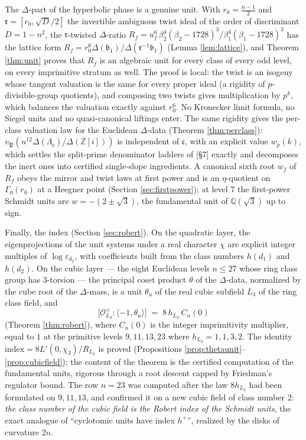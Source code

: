 \documentclass[11pt]{amsart}
\numberwithin{equation}{section}
\theoremstyle{plain}
\theoremstyle{definition}
\theoremstyle{remark}
\newcommand{\Q}{\mathbb{Q}}
\newcommand{\Z}{\mathbb{Z}}
\newcommand{\Zi}{\Z[i]}
\newcommand{\idealb}{\mathfrak{b}}
\newcommand{\idealc}{\mathfrak{c}}
\newcommand{\idealP}{\mathfrak{P}}
\newcommand{\idealr}{\mathfrak{r}}
\newcommand{\lat}[1]{\left[#1\right]}
\newcommand{\Oc}{\mathcal{O}}
\newcommand{\eps}{\varepsilon}
\newcommand{\PaperI}{\cite{SchmidtI}}
\begin{document}
The $\Delta$-part of the hyperbolic phase is a genuine unit.  With
$r_0 = \tfrac{n-1}2$ and $\idealr = \lat{r_0, \sqrt D/2}$ the invertible
ambiguous twist ideal of the order of discriminant $D = 1 - n^2$, the
$\idealr$-twisted $\Delta$-ratio
$R_f = u_f^{6}\,\beta_2^4(\beta_2-1728)^3/\beta_1^4(\beta_1-1728)^3$ has
the lattice form $R_f = r_0^{6}\Delta(\idealb_1)/\Delta(\idealr^{-1}\idealb_1)$
(Lemma \ref{lem:lattice}), and Theorem \ref{thm:unit} proves that $R_f$
is an algebraic unit for every class of every odd level, on every
imprimitive stratum as well.  The proof is local: the twist is an isogeny
whose tangent valuation is the same for every proper ideal (a rigidity of
$p$-divisible-group quotients), and composing two twists gives
multiplication by $p^k$, which balances the valuation exactly against
$r_0^6$.  No Kronecker limit formula, no Siegel units and no
quasi-canonical liftings enter.  The same rigidity gives the per-class
valuation law for the Euclidean $\Delta$-data (Theorem \ref{thm:perclass}):
$v_\idealP(n^{12}\Delta(\Lambda_\idealc)/\Delta(\Zi))$ is independent of
$\idealc$, with an explicit value $w_p(k)$, which settles the
split-prime denominator ladders of \PaperI[\S7] exactly and decomposes
the inert ones into certified single-slope ingredients.  A canonical
sixth root $w_f$ of $R_f$ obeys the mirror and twist laws at first power
and is an $\eta$-quotient on $\Gamma_0(r_0)$ at a Heegner point (Section
\ref{sec:firstpower}); at level $7$ the first-power Schmidt units are
$w = -(2 \pm \sqrt3)$, the fundamental unit of $\Q(\sqrt3)$ up to sign.

Finally, the index (Section \ref{sec:robert}).  On the quadratic layer,
the eigenprojections of the unit systems under a real character $\chi$
are explicit integer multiples of $\log\eps_{d_2}$, with coefficients
built from the class numbers $h(d_1)$ and $h(d_2)$.  On the
cubic layer --- the eight Euclidean levels $n \le 27$ whose ring class
group has $3$-torsion --- the principal coset product $\theta$ of the
$\Delta$-data, normalized by the cube root of the $\Delta$-mass, is a unit
$\theta_u$ of the real cubic subfield $L_3$ of the ring class field, and
\[
  \bigl[\Oc_{L_3}^\times : \langle -1, \theta_u\rangle\bigr]
  \;=\; 8\,h_{L_3}\,C_n(0)
\]
(Theorem \ref{thm:robert}), where $C_n(0)$ is the integer imprimitivity
multiplier, equal to $1$ at the primitive levels $9, 11, 13, 23$ where
$h_{L_3} = 1, 1, 3, 2$.  The identity $\text{index} = 8L'(0,\chi_3)/R_{L_3}$
is proved (Propositions \ref{prop:thetaunit}--\ref{prop:cubicfield}); the
content of the theorem is the certified computation of the fundamental
units, rigorous through a root descent capped by Friedman's regulator
bound.  The row $n = 23$ was computed after the law $8h_{L_3}$ had been
formulated on $9, 11, 13$, and confirmed it on a new cubic field of class
number $2$: \emph{the class number of the cubic field is the Robert index
of the Schmidt units}, the exact analogue of ``cyclotomic units have index
$h^+$'', realized by the disks of curvature $2n$.
\end{document}
